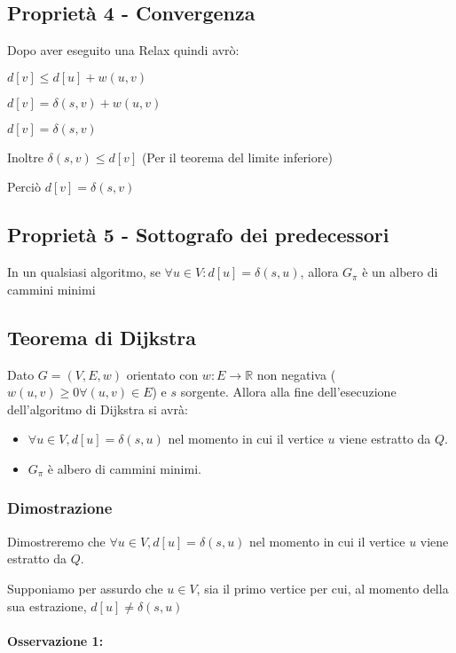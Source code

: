 \subsection{Proprietà 4 - Convergenza}

{Dopo aver eseguito una Relax quindi avrò:}

$d[v] \leq d[u] + w(u,v)$

$d[v] = \delta(s,v) + w(u,v)$

$d[v] = \delta(s,v)$

Inoltre $\delta(s,v) \leq d[v]$ (Per il teorema del limite inferiore)

Perciò $d[v]=\delta(s,v)$

\subsection{Proprietà 5 - Sottografo dei predecessori}

{In un qualsiasi algoritmo, se $\forall u \in V: d[u] = \delta(s,u)$, allora $G_\pi$ è un albero di cammini minimi}

\subsection{Teorema di Dijkstra}

{Dato $G=(V,E,w)$ orientato con $w:E\rightarrow \mathbb{R}$ non negativa ($w(u,v) \geq 0 \forall (u,v) \in E$) e $s$ sorgente. Allora alla fine dell'esecuzione dell'algoritmo di Dijkstra si avrà:}

\begin{itemize}
\tightlist
\item
{$\forall u \in V, d[u]=\delta(s,u)$ nel momento in cui il vertice $u$ viene estratto da $Q$.}
\item
{$G_\pi$ è albero di cammini minimi.}
\end{itemize}

\subsubsection{Dimostrazione}

{Dimostreremo che $\forall u \in V, d[u]=\delta(s,u)$ nel momento in cui il vertice $u$ viene estratto da $Q$.}

{Supponiamo per assurdo che $u\in V$, sia il primo vertice per cui, al momento della sua estrazione, $d[u] \neq \delta(s,u)$}

\paragraph{Osservazione 1:}


